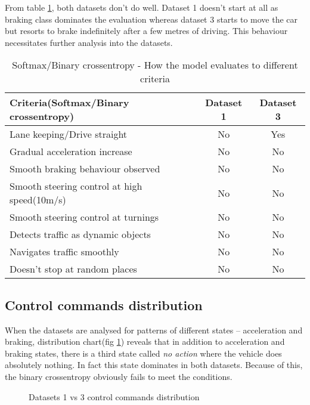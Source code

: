 From table \ref{table:softmaxandbce}, both datasets don't do well. Dataset 1 doesn't start
at all as braking class dominates the evaluation whereas dataset 3 starts to move the car
but resorts to brake indefinitely after a few metres of driving. This behaviour
necessitates further analysis into the datasets.
\begin{table}[h]
    \centering
\begin{tabular}{lcc}
    \toprule
    Criteria(Softmax/Binary crossentropy) & Dataset 1 & Dataset 3 \\\midrule
    Lane keeping/Drive straight  & No & Yes  \\
    Gradual acceleration increase & No & No\\
    Smooth braking behaviour observed & No & No \\
    Smooth steering control at high speed(10m/s) & No & No \\
    Smooth steering control at turnings & No & No\\
    Detects traffic as dynamic objects & No & No\\
    Navigates traffic smoothly & No & No\\
    Doesn't stop at random places & No & No \\\bottomrule
\end{tabular}
\caption{Softmax/Binary crossentropy - How the model evaluates to different criteria}
\label{table:softmaxandbce}
\end{table}
\iffalse
\begin{figure}[h]
	\centering
    \def\svgwidth{0.8\textwidth}
    \caption{Dataset 1 - Binary Crossentropy}
    \label{fig:ds1binarycrossentropy}
\end{figure}

\begin{figure}[h]
	\centering
    \def\svgwidth{0.8\textwidth}
    \caption{Dataset 3 - Binary Crossentropy}
    \label{fig:ds3binarycrossentropy}
\end{figure}
\fi
\subsection*{Control commands distribution}
When the datasets are analysed for patterns of different states -- acceleration and
braking, distribution chart(fig \ref{fig:datasetscomparectrlcmds}) reveals that in addition to
acceleration and braking states, there is a third state called \textit{no action} where
the vehicle does absolutely nothing. In fact this state dominates in both datasets.
Because of this, the binary crossentropy obviously fails to meet the conditions.
\begin{figure}[!ht]
    \centering
    \def\svgwidth{\textwidth}
    
    \caption{Datasets 1 vs 3 control commands distribution}
    \label{fig:datasetscomparectrlcmds}
\end{figure}


